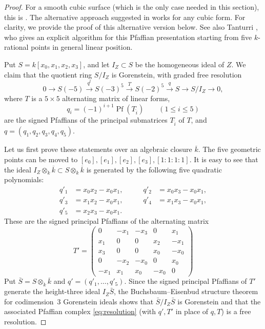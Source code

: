 \documentclass[a4paper,11pt]{amsart}
\numberwithin{equation}{section}
\theoremstyle{definition}
\theoremstyle{remark}
\DeclareMathOperator{\Pf}{Pf}
\newcommand{\bk}{\overline{k}}
\begin{document}
\begin{proof} 
For a smooth cubic surface (which is the only case needed in this section), this is \cite[Proposition~7.2 and Examples 7.4]{Beauville}. 
The alternative approach suggested in \cite[Remark 7.3(b)]{Beauville}
works for any cubic form. 
For clarity, we provide the proof of this alternative version below. See also
Tanturri \cite[Section~2]{Tanturri}, who gives an explicit algorithm for this Pfaffian presentation starting from five $k$-rational points in general linear position.
  
  Put $S=k[x_0,x_1,x_2,x_3]$, and let $I_Z\subset S$ be the homogeneous
  ideal of $Z$. We claim that the quotient ring $S/I_Z$ is Gorenstein, with graded free resolution
\begin{equation}\label{eq:resolution}
 0\longrightarrow S(-5)\xrightarrow{\ q^t\ } S(-3)^5
  \xrightarrow{\ T\ } S(-2)^5 
 \xrightarrow{\ q\ } S \longrightarrow S/I_Z\longrightarrow 0,
\end{equation}
where $T$ is a $5\times 5$ alternating matrix of linear forms,
\[
 q_i=(-1)^{i+1}\Pf(T_{\widehat i})\qquad(1\le i\le5)
\]
are the signed Pfaffians of the principal submatrices $T_{\widehat i}$ of
$T$, and $q = (q_1,q_2,q_3,q_4,q_5)$.

Let us first prove these statements over an algebraic closure $\bk$. 
The five geometric points can be moved to
$[e_0],[e_1],[e_2],[e_3],[1:1:1:1]$. It is easy to see that the ideal $I_Z\otimes_k\bk \subset S\otimes_k\bk$ is
generated by the following five quadratic polynomials: 
\begin{displaymath}
  \begin{aligned}
    q'_1&=x_0x_2-x_0x_1, &\qquad q'_2&=x_0x_3-x_0x_1,\\
    q'_3&=x_1x_2-x_0x_1, &\qquad q'_4&=x_1x_3-x_0x_1,\\
    q'_5&=x_2x_3-x_0x_1.
  \end{aligned}
\end{displaymath}
These are the signed principal Pfaffians of the alternating matrix
\begin{displaymath}
  T' =
  \begin{pmatrix}
    0 & -x_1 & -x_3 & 0 & x_1 \\
    x_1 & 0 & 0 & x_2 & -x_1 \\
    x_3 & 0 & 0 & x_0 & -x_0 \\
    0 & -x_2 & -x_0 & 0 & x_0 \\
    -x_1 & x_1 & x_0 & -x_0 & 0
  \end{pmatrix}
\end{displaymath}
Put $\bar S=S\otimes_k\bk$ and $q'=(q'_1,\ldots,q'_5)$.
Since the signed principal
Pfaffians of $T'$ generate the height-three ideal $I_Z\bar S$,
the Buchsbaum--Eisenbud structure theorem 
for codimension~$3$ Gorenstein ideals
\cite[Theorem~2.1(1)]{BE} shows that
$\bar S/I_Z\bar S$ is Gorenstein and that the associated
Pfaffian complex \eqref{eq:resolution} (with $q',T'$ in place of $q,T$) is a free resolution. 


\end{proof}
\end{document}
